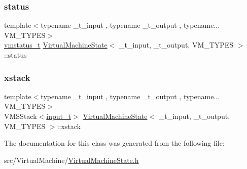 \mbox{\label{class_virtual_machine_state_a6e561a217081654b4187620953e86fff}} 
\subsubsection{\texorpdfstring{status}{status}}
{\footnotesize\ttfamily template$<$typename \+\_\+t\+\_\+input , typename \+\_\+t\+\_\+output , typename... V\+M\+\_\+\+T\+Y\+P\+ES$>$ \\
\hyperlink{_v_m_status_8h_a6202215407ab29590bb936ca2996cf64}{vmstatus\+\_\+t} \hyperlink{class_virtual_machine_state}{Virtual\+Machine\+State}$<$ \+\_\+t\+\_\+input, \+\_\+t\+\_\+output, V\+M\+\_\+\+T\+Y\+P\+ES $>$\+::status}

\mbox{\label{class_virtual_machine_state_aded245a367f3caca62faf7264feaff41}} 
\subsubsection{\texorpdfstring{xstack}{xstack}}
{\footnotesize\ttfamily template$<$typename \+\_\+t\+\_\+input , typename \+\_\+t\+\_\+output , typename... V\+M\+\_\+\+T\+Y\+P\+ES$>$ \\
V\+M\+S\+Stack$<$\hyperlink{class_virtual_machine_state_aeb5e01ec57466fd3734e0c29f2b8da0a}{input\+\_\+t}$>$ \hyperlink{class_virtual_machine_state}{Virtual\+Machine\+State}$<$ \+\_\+t\+\_\+input, \+\_\+t\+\_\+output, V\+M\+\_\+\+T\+Y\+P\+ES $>$\+::xstack}



The documentation for this class was generated from the following file\+:\begin{DoxyCompactItemize}
\item 
src/\+Virtual\+Machine/\hyperlink{_virtual_machine_state_8h}{Virtual\+Machine\+State.\+h}\end{DoxyCompactItemize}
